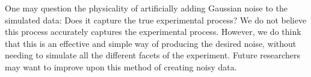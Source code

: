 		One may question the physicality of artificially adding Gaussian noise to the simulated data:
		Does it capture the true experimental process?
		We do not believe this process accurately captures the experimental process.
		However, we do think that this is an effective and simple way of producing the desired noise, without needing to simulate all the different facets of the experiment.
		Future researchers may want to improve upon this method of creating noisy data.











































